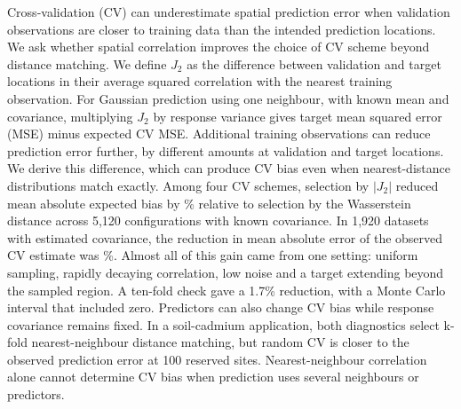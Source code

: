Cross-validation (CV) can underestimate spatial prediction error when validation observations are closer to training data than the intended prediction locations. We ask whether spatial correlation improves the choice of CV scheme beyond distance matching. We define $J_2$ as the difference between validation and target locations in their average squared correlation with the nearest training observation. For Gaussian prediction using one neighbour, with known mean and covariance, multiplying $J_2$ by response variance gives target mean squared error (MSE) minus expected CV MSE. Additional training observations can reduce prediction error further, by different amounts at validation and target locations. We derive this difference, which can produce CV bias even when nearest-distance distributions match exactly. Among four CV schemes, selection by $|J_2|$ reduced mean absolute expected bias by \BiasReduction\% relative to selection by the Wasserstein distance across 5,120 configurations with known covariance. In 1,920 datasets with estimated covariance, the reduction in mean absolute error of the observed CV estimate was \NestedReduction\%. Almost all of this gain came from one setting: uniform sampling, rapidly decaying correlation, low noise and a target extending beyond the sampled region. A ten-fold check gave a 1.7\% reduction, with a Monte Carlo interval that included zero. Predictors can also change CV bias while response covariance remains fixed. In a soil-cadmium application, both diagnostics select k-fold nearest-neighbour distance matching, but random CV is closer to the observed prediction error at 100 reserved sites. Nearest-neighbour correlation alone cannot determine CV bias when prediction uses several neighbours or predictors.

